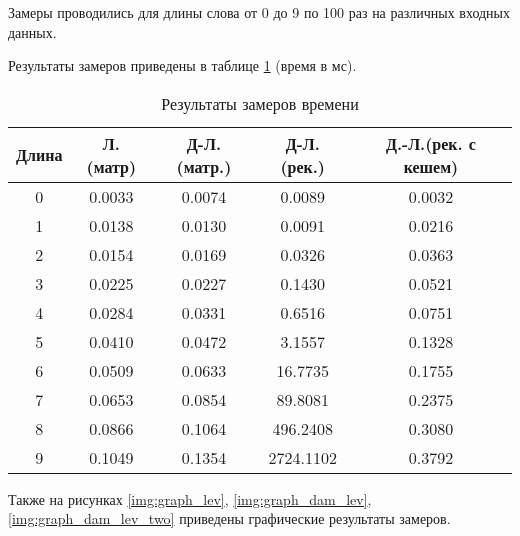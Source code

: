 Замеры проводились для длины слова от 0 до 9 по 100 раз на различных входных данных.

Результаты замеров приведены в таблице \ref{tbl:time_mes} (время в мс).

\begin{table}[h]
    \begin{center}
        \begin{threeparttable}
        \captionsetup{justification=raggedright,singlelinecheck=off}
        \caption{Результаты замеров времени}
        \label{tbl:time_mes}
        \begin{tabular}{|c|c|c|c|c|}
            \hline
            Длина & Л.(матр) & Д-Л.(матр.)& Д-Л.(рек.) & Д.-Л.(рек. с кешем)  \\
            \hline
            0 & 0.0033 & 0.0074 & 0.0089 & 0.0032 \\
            \hline
            1 & 0.0138 & 0.0130 & 0.0091 & 0.0216 \\ 
            \hline
            2 & 0.0154 & 0.0169 & 0.0326 & 0.0363 \\ 
            \hline
            3 & 0.0225 & 0.0227 & 0.1430 & 0.0521 \\ 
            \hline
            4 & 0.0284 & 0.0331 & 0.6516 & 0.0751 \\ 
            \hline
            5 & 0.0410 & 0.0472 & 3.1557 & 0.1328 \\ 
            \hline
            6 & 0.0509 & 0.0633 & 16.7735 & 0.1755 \\ 
            \hline
            7 & 0.0653 & 0.0854 & 89.8081 & 0.2375 \\ 
            \hline
            8 & 0.0866 & 0.1064 & 496.2408 & 0.3080 \\ 
            \hline
            9 & 0.1049 & 0.1354 & 2724.1102 & 0.3792 \\ 
            \hline
		\end{tabular}
    \end{threeparttable}
\end{center}
\end{table}

Также на рисунках \ref{img:graph_lev}, \ref{img:graph_dam_lev}, \ref{img:graph_dam_lev_two} приведены графические результаты замеров.



